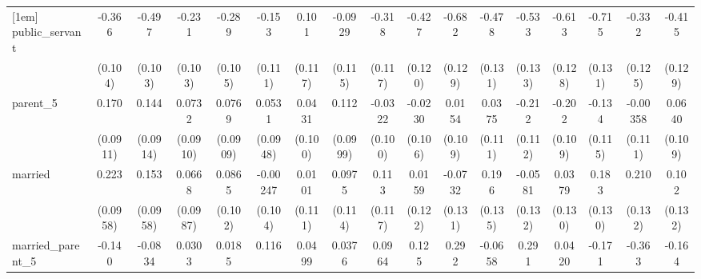 {\begin{tabular}{l*{16}{c}}
[1em]
public\_servant      &      -0.366\sym{***}&      -0.497\sym{***}&      -0.231\sym{*}  &      -0.289\sym{**} &      -0.153         &       0.101         &     -0.0929         &      -0.318\sym{**} &      -0.427\sym{***}&      -0.682\sym{***}&      -0.478\sym{***}&      -0.533\sym{***}&      -0.613\sym{***}&      -0.715\sym{***}&      -0.332\sym{**} &      -0.415\sym{**} \\
                    &     (0.104)         &     (0.103)         &     (0.103)         &     (0.105)         &     (0.111)         &     (0.117)         &     (0.115)         &     (0.117)         &     (0.120)         &     (0.129)         &     (0.131)         &     (0.133)         &     (0.128)         &     (0.131)         &     (0.125)         &     (0.129)         \\
[1em]
parent\_5            &       0.170         &       0.144         &      0.0732         &      0.0769         &      0.0531         &      0.0431         &       0.112         &     -0.0322         &     -0.0230         &      0.0154         &      0.0375         &      -0.212         &      -0.202         &      -0.134         &    -0.00358         &      0.0640         \\
                    &    (0.0911)         &    (0.0914)         &    (0.0910)         &    (0.0909)         &    (0.0948)         &     (0.100)         &    (0.0999)         &     (0.100)         &     (0.106)         &     (0.109)         &     (0.111)         &     (0.112)         &     (0.109)         &     (0.115)         &     (0.111)         &     (0.109)         \\
[1em]
married             &       0.223\sym{*}  &       0.153         &      0.0668         &      0.0865         &    -0.00247         &      0.0101         &      0.0975         &       0.113         &      0.0159         &     -0.0732         &       0.196         &     -0.0581         &      0.0379         &       0.183         &       0.210         &       0.102         \\
                    &    (0.0958)         &    (0.0958)         &    (0.0987)         &     (0.102)         &     (0.104)         &     (0.111)         &     (0.114)         &     (0.117)         &     (0.122)         &     (0.131)         &     (0.135)         &     (0.132)         &     (0.130)         &     (0.130)         &     (0.132)         &     (0.132)         \\
[1em]
married\_parent\_5    &      -0.140         &     -0.0834         &      0.0303         &      0.0185         &       0.116         &      0.0499         &      0.0376         &      0.0964         &       0.125         &       0.292         &     -0.0658         &       0.291         &      0.0420         &      -0.171         &      -0.363\sym{*}  &      -0.164         \\

\end{tabular}}
